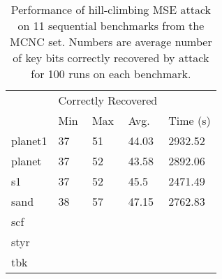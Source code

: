 \begin{table}[ht]
\centering
\caption{Performance of hill-climbing MSE attack on 11 sequential benchmarks from the MCNC set. Numbers are average number of key bits correctly recovered by attack for 100 runs on each benchmark.}
\label{my-label}
\begin{tabular}{|l|l|l|l|l|}
\hline
                  & \multicolumn{3}{l|}{Correctly Recovered} &          %
                  \\ \cline{2-5} 
                  & Min         & Max         & Avg.         & Time (s) \\ \hline
planet1             & 37          & 51           &  44.03        &2932.52\\ \hline
planet             &   37        &   52        &43.58          &2892.06
\\ \hline
s1             &    37       &    52       &         45.5  &2471.49
\\ \hline
sand             &   38        &   57        &   47.15       & 2762.83
\\ \hline
scf             &           &           &          &\\ \hline
styr             &           &           &          &\\ \hline
tbk             &           &           &          &\\ \hline

\end{tabular}
\end{table}

